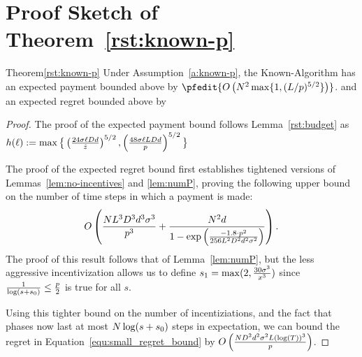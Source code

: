 \section{Proof Sketch of Theorem~\ref{rst:known-p}}
\label{sec:discussion-proof2}


\begin{rtheorem}{Theorem}{\ref{rst:known-p}}
Under Assumption~\ref{a:known-p}, the Known-\MinProb Algorithm has an expected payment bounded above by 
$\pfedit{O\left(N^2 \max\{1, (L/p)^{5/2}\}\right)}$.
and an expected regret bounded above by
\end{rtheorem}

\begin{proof}
	The proof of the expected payment bound follows Lemma~\ref{rst:budget} 
    as $h(\ell) := \max\big\{ \left(\frac{24\sigma \ell D d}{\hat{z}} \right)^{5/2},
        \left( \frac{48\sigma \ell L D d}{p} \right)^{5/2}\big\}$


The proof of the expected regret bound first establishes tightened versions of Lemmas~\ref{lem:no-incentives} and \ref{lem:numP},
proving the following upper bound on the number of time steps in which a payment is made:
\begin{align}
O\left(\frac{N L^3 D^3 d^3 \sigma^3}{p^3}
  + \frac{N^2 d}{1 - \exp \left(
    \frac{-1.8 \cdot p^2}{256 L^2 D^2 d^2 \sigma^2}
  \right)} \right). \nonumber 
\end{align}
The proof of this result follows that of Lemma~\ref{lem:numP},
but the less aggressive incentivization allows us to define $s_1 = \max(2, \frac{30 \sigma^3}{x^3})$ since $\frac{1}{\log(s+s_0)} \leq \frac{p}{2}$ is true for all $s$.

Using this tighter bound on the number of incentiziations, and the fact that phases now last at most $N \log(s+s_0)$ steps in expectation, we can bound the regret in Equation~\ref{equ:small_regret_bound} by
$O\left(\frac{ND^2 d^2\sigma^2 L(\log(T))^3}{p}\right)$.
\end{proof}
